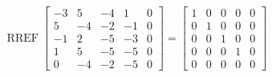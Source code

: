 \begin{exerciseAnswer} 


\[\operatorname{RREF} \left[\begin{array}{cccc|c}
-3 & 5 & -4 & 1 & 0 \\
5 & -4 & -2 & -1 & 0 \\
-1 & 2 & -5 & -3 & 0 \\
1 & 5 & -5 & -5 & 0 \\
0 & -4 & -2 & -5 & 0
\end{array}\right] = \left[\begin{array}{cccc|c}
1 & 0 & 0 & 0 & 0 \\
0 & 1 & 0 & 0 & 0 \\
0 & 0 & 1 & 0 & 0 \\
0 & 0 & 0 & 1 & 0 \\
0 & 0 & 0 & 0 & 0
\end{array}\right] \]



\end{exerciseAnswer}
